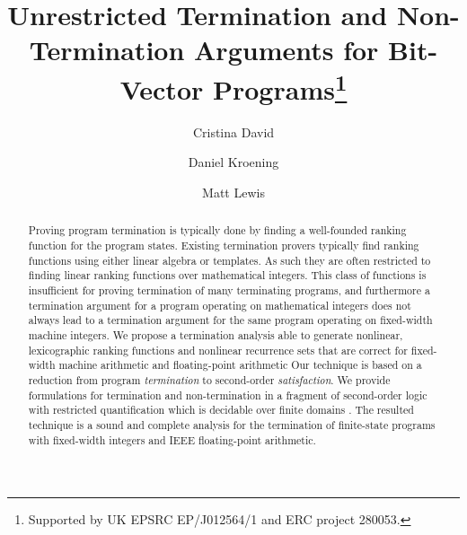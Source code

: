 \documentclass[a4paper]{llncs}
\begin{document}
\setlength{\pdfpageheight}{\paperheight}
\setlength{\pdfpagewidth}{\paperwidth}





\title{Unrestricted Termination and Non-Termination Arguments for Bit-Vector
Programs\thanks{Supported by UK EPSRC EP/J012564/1 and ERC project 280053.}}

\author{Cristina David\and Daniel Kroening\and Matt Lewis}




\maketitle

\begin{abstract}
%
Proving program termination is typically done by finding a well-founded
ranking function for the program states.  Existing termination
provers typically find ranking functions using either linear algebra or
templates.  As such they are often restricted to finding linear ranking
functions over mathematical integers.  This class of functions is
insufficient for proving termination of many terminating programs, and
furthermore a termination argument for a program operating on mathematical
integers does not always lead to a termination argument for the same program
operating on fixed-width machine integers.
We propose a termination analysis able 
to generate nonlinear, lexicographic ranking functions and
nonlinear recurrence sets that are correct for fixed-width machine arithmetic
and floating-point arithmetic
Our technique is based on a reduction from program \emph{termination} to 
second-order \emph{satisfaction}. We provide 
formulations for termination and non-termination in a fragment of second-order logic 
with restricted quantification which is decidable over finite domains \cite{kalashnikov}.
The resulted technique is a sound and complete analysis for the termination 
of finite-state programs with fixed-width
integers and IEEE floating-point arithmetic.
%
\end{abstract}
\end{document}
